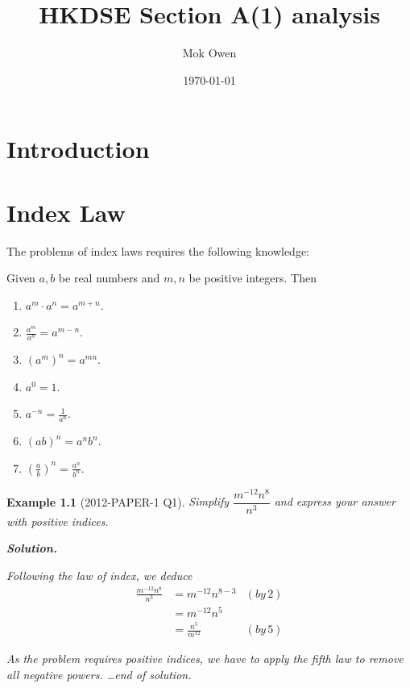 \documentclass[12pt]{book}
\title{HKDSE Section A(1) analysis}
\author{Mok Owen}
\date{\today}
\newtheorem*{example}{Example}
\newenvironment{solution}{\textbf{Solution.} \par}{\hfill \textit{\dots end of solution.}}
\begin{document}
    \maketitle
    
    \tableofcontents

    \newpage

    \chapter*{Introduction}

    \chapter{Index Law}

    The problems of index laws requires the following knowledge:

    Given $a,b$ be real numbers and $m,n$ be positive integers. Then
    \begin{enumerate}
        \item $a^m\cdot a^n=a^{m+n}$.
        \item $\frac{a^m}{a^n}=a^{m-n}$.
        \item $(a^m)^n=a^{mn}$.
        \item $a^0=1$.
        \item $a^{-n}=\frac{1}{a^n}$.
        \item $(ab)^n=a^n b^n$.
        \item $(\frac{a}{b})^n=\frac{a^n}{b^n}$.
    \end{enumerate}

    \begin{example}[2012-PAPER-1 Q1]
        Simplify $\dfrac{m^{-12}n^8}{n^3}$ and express your answer with positive indices.

        \begin{solution}
            Following the law of index, we deduce
            \begin{align*}
                \frac{m^{-12}n^8}{n^3}&=m^{-12}n^{8-3} &(by\, 2)\\
                &=m^{-12}n^5\\
                &=\frac{n^5}{m^{12}}&(by\, 5)
            \end{align*}

            As the problem requires positive indices, we have to apply the fifth law to remove all negative powers.
        \end{solution}
    \end{example}
    
\end{document}
